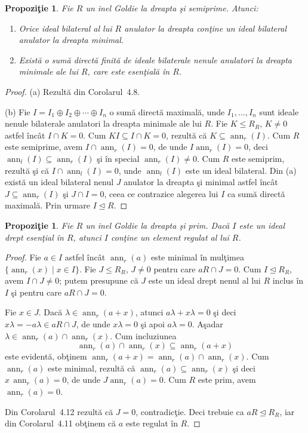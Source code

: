 \documentclass[12pt,a4paper]{book}
\DeclareMathOperator{\ann}{ann}
\newcommand{\ess}{\trianglelefteq}  %
\theoremstyle{plain}
\newtheorem{proposition}[theorem]{Propoziţie}
\theoremstyle{definition}
\theoremstyle{remark}
\begin{document}
\begin{proposition}
Fie $R$ un inel Goldie la dreapta şi semiprime. Atunci:
\begin{enumerate}
  \item[(a)] Orice ideal bilateral al lui $R$ anulator la dreapta
             conţine un ideal bilateral anulator la dreapta minimal.
  \item[(b)] Există o sumă directă finită de ideale bilaterale nenule
             anulatori la dreapta minimale ale lui $R$, care este
             esenţială în $R$.
\end{enumerate}
\end{proposition}

\begin{proof}
(a) Rezultă din Corolarul~4.8.

(b) Fie $I = I_1 \oplus I_2 \oplus \cdots \oplus I_n$ o sumă directă
maximală, unde $I_1,\dots,I_n$ sunt ideale nenule bilaterale anulatori
la dreapta minimale ale lui $R$. Fie $K \leq R_R$, $K \neq 0$ astfel
încât $I \cap K = 0$. Cum $KI \subseteq I \cap K = 0$, rezultă că
$K \subseteq \ann_r(I)$. Cum $R$ este semiprime, avem
$I \cap \ann_r(I) = 0$, de unde $I\ann_r(I) = 0$, deci
$\ann_l(I) \subseteq \ann_r(I)$ şi în special $\ann_r(I) \neq 0$.
Cum $R$ este semiprim, rezultă şi că $I \cap \ann_l(I) = 0$, unde
$\ann_l(I)$ este un ideal bilateral. Din (a) există un ideal bilateral
nenul $J$ anulator la dreapta şi minimal astfel încât
$J \subseteq \ann_r(I)$ şi $J \cap I = 0$, ceea ce contrazice
alegerea lui $I$ ca sumă directă maximală. Prin urmare $I \ess R$.
\end{proof}


\begin{proposition}
Fie $R$ un inel Goldie la dreapta şi prim. Dacă $I$ este un ideal
drept esenţial în $R$, atunci $I$ conţine un element regulat al lui $R$.
\end{proposition}

\begin{proof}
Fie $a \in I$ astfel încât $\ann_r(a)$ este minimal în mulţimea
$\{\ann_r(x) \mid x \in I\}$. Fie $J \leq R_R$, $J \neq 0$ pentru care
$aR \cap J = 0$. Cum $I \ess R_R$, avem $I \cap J \neq 0$; putem
presupune că $J$ este un ideal drept nenul al lui $R$ inclus în $I$
şi pentru care $aR \cap J = 0$.

Fie $x \in J$. Dacă $\lambda \in \ann_r(a+x)$, atunci
$a\lambda + x\lambda = 0$ şi deci $x\lambda = -a\lambda \in aR \cap J$,
de unde $x\lambda = 0$ şi apoi $a\lambda = 0$. Aşadar
$\lambda \in \ann_r(a) \cap \ann_r(x)$. Cum incluziunea
\[
  \ann_r(a) \cap \ann_r(x) \subseteq \ann_r(a+x)
\]
este evidentă, obţinem $\ann_r(a+x) = \ann_r(a) \cap \ann_r(x)$.
Cum $\ann_r(a)$ este minimal, rezultă că $\ann_r(a) \subseteq \ann_r(x)$
şi deci $x\,\ann_r(a) = 0$, de unde $J \ann_r(a) = 0$.
Cum $R$ este prim, avem $\ann_r(a) = 0$.

Din Corolarul~4.12 rezultă că $J = 0$, contradicţie. Deci trebuie ca
$aR \ess R_R$, iar din Corolarul~4.11 obţinem că $a$ este regulat în
$R$.
\end{proof}
\end{document}
